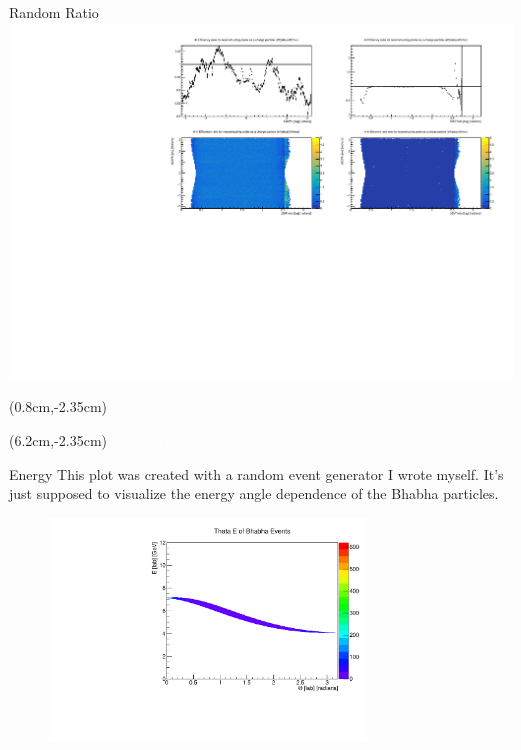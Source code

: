 \documentclass[10pt]{beamer}
\begin{document}
\begin{frame}{Random Ratio}
	\centering
	\includegraphics[width=\textwidth]{Additional/RandomRatio}
	
	
		\begin{textblock*}{0.3\textwidth}(0.8cm,-2.35cm)
		\scriptsize{\textcolor{white}{Ratio}}
	\end{textblock*}
	
	\begin{textblock*}{0.3\textwidth}(6.2cm,-2.35cm)
		\scriptsize{\textcolor{white}{Ratio Error}}
	\end{textblock*}
	
	
	
\end{frame}



\begin{frame}{Energy}
	This plot was created with a random event generator I wrote myself. It's just supposed to visualize the energy angle dependence of the Bhabha particles.
	\begin{figure}
		\centering
		\includegraphics[width=0.75\textwidth]{Plots/theta_lab.pdf}
	\end{figure}
\end{frame}
\end{document}
